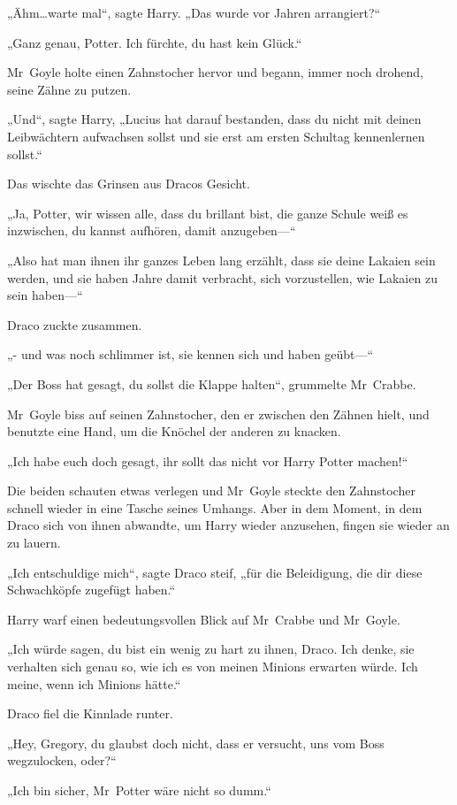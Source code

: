 {„Ähm…warte mal“, sagte Harry. „Das wurde vor Jahren arrangiert?“

„Ganz genau, Potter. Ich fürchte, du hast kein Glück.“

Mr~Goyle holte einen Zahnstocher hervor und begann, immer noch drohend, seine Zähne zu putzen.

„Und“, sagte Harry, „Lucius hat darauf bestanden, dass du nicht mit deinen Leibwächtern aufwachsen sollst und sie erst am ersten Schultag kennenlernen sollst.“

Das wischte das Grinsen aus Dracos Gesicht.

„Ja, Potter, wir wissen alle, dass du brillant bist, die ganze Schule weiß es inzwischen, du kannst aufhören, damit anzugeben—“

„Also hat man ihnen ihr ganzes Leben lang erzählt, dass sie deine Lakaien sein werden, und sie haben Jahre damit verbracht, sich vorzustellen, wie Lakaien zu sein haben—“

Draco zuckte zusammen.

„- und was noch schlimmer ist, sie kennen sich und haben geübt—“

„Der Boss hat gesagt, du sollst die Klappe halten“, grummelte Mr~Crabbe.

Mr~Goyle biss auf seinen Zahnstocher, den er zwischen den Zähnen hielt, und benutzte eine Hand, um die Knöchel der anderen zu knacken.

„Ich habe euch doch gesagt, ihr sollt das nicht vor Harry Potter machen!“

Die beiden schauten etwas verlegen und Mr~Goyle steckte den Zahnstocher schnell wieder in eine Tasche seines Umhangs. Aber in dem Moment, in dem Draco sich von ihnen abwandte, um Harry wieder anzusehen, fingen sie wieder an zu lauern.

„Ich entschuldige mich“, sagte Draco steif, „für die Beleidigung, die dir diese Schwachköpfe zugefügt haben.“

Harry warf einen bedeutungsvollen Blick auf Mr~Crabbe und Mr~Goyle.

„Ich würde sagen, du bist ein wenig zu hart zu ihnen, Draco. Ich denke, sie verhalten sich genau so, wie ich es von meinen Minions erwarten würde. Ich meine, wenn ich Minions hätte.“

Draco fiel die Kinnlade runter.

„Hey, Gregory, du glaubst doch nicht, dass er versucht, uns vom Boss wegzulocken, oder?“

„Ich bin sicher, Mr~Potter wäre nicht so dumm.“

}
